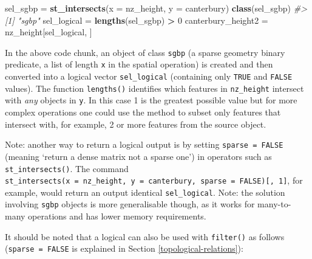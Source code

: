 \documentclass[]{krantz}
\newenvironment{Shaded}{\begin{snugshade}}{\end{snugshade}}
\newcommand{\CommentTok}[1]{\textcolor[rgb]{0.37,0.37,0.37}{\textit{#1}}}
\newcommand{\DataTypeTok}[1]{\textcolor[rgb]{0.27,0.27,0.27}{#1}}
\newcommand{\DecValTok}[1]{\textcolor[rgb]{0.06,0.06,0.06}{#1}}
\newcommand{\KeywordTok}[1]{\textcolor[rgb]{0.27,0.27,0.27}{\textbf{#1}}}
\newcommand{\NormalTok}[1]{#1}
\newcommand{\OperatorTok}[1]{\textcolor[rgb]{0.43,0.43,0.43}{\textbf{#1}}}
\newcommand{\OtherTok}[1]{\textcolor[rgb]{0.37,0.37,0.37}{#1}}
\newcommand{\StringTok}[1]{\textcolor[rgb]{0.5,0.5,0.5}{#1}}
\let\BeginKnitrBlock\begin \let\EndKnitrBlock\end
\begin{document}
\begin{Shaded}
\begin{Highlighting}[]
\NormalTok{sel_sgbp =}\StringTok{ }\KeywordTok{st_intersects}\NormalTok{(}\DataTypeTok{x =}\NormalTok{ nz_height, }\DataTypeTok{y =}\NormalTok{ canterbury)}
\KeywordTok{class}\NormalTok{(sel_sgbp)}
\CommentTok{#> [1] "sgbp"}
\NormalTok{sel_logical =}\StringTok{ }\KeywordTok{lengths}\NormalTok{(sel_sgbp) }\OperatorTok{>}\StringTok{ }\DecValTok{0}
\NormalTok{canterbury_height2 =}\StringTok{ }\NormalTok{nz_height[sel_logical, ]}
\end{Highlighting}
\end{Shaded}

In the above code chunk, an object of class \texttt{sgbp} (a sparse geometry binary predicate, a list of length \texttt{x} in the spatial operation) is created and then converted into a logical vector \texttt{sel\_logical} (containing only \texttt{TRUE} and \texttt{FALSE} values).
The function \texttt{lengths()} identifies which features in \texttt{nz\_height} intersect with \emph{any} objects in \texttt{y}.
In this case 1 is the greatest possible value but for more complex operations one could use the method to subset only features that intersect with, for example, 2 or more features from the source object.

\BeginKnitrBlock{rmdnote}
Note: another way to return a logical output is by setting \texttt{sparse\ =\ FALSE} (meaning `return a dense matrix not a sparse one') in operators such as \texttt{st\_intersects()}. The command \texttt{st\_intersects(x\ =\ nz\_height,\ y\ =\ canterbury,\ sparse\ =\ FALSE){[},\ 1{]}}, for example, would return an output identical \texttt{sel\_logical}.
Note: the solution involving \texttt{sgbp} objects is more generalisable though, as it works for many-to-many operations and has lower memory requirements.
\EndKnitrBlock{rmdnote}

It should be noted that a logical can also be used with \texttt{filter()} as follows (\texttt{sparse\ =\ FALSE} is explained in Section \ref{topological-relations}):

\begin{Shaded}
\end{Shaded}
\end{document}
